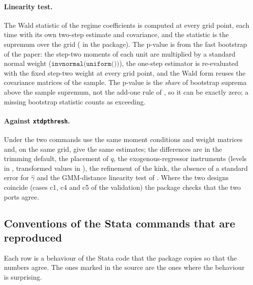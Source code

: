 \paragraph{Linearity test.} The Wald statistic of the regime coefficients is computed at every grid point, each time
with its own two-step estimate and covariance, and the statistic is the supremum over the grid
( in the package). The p-value is from the fast bootstrap of the paper: the step-two moments of each
unit are multiplied by a standard normal weight ($\texttt{invnormal(uniform())}$), the one-step estimator is
re-evaluated with the fixed step-two weight at every grid point, and the Wald form reuses the covariance matrices of the
sample. The p-value is the \emph{share} of bootstrap suprema above the sample supremum, not the add-one rule of
, so it can be exactly zero; a missing bootstrap statistic counts as exceeding.

\paragraph{Against \texttt{xtdpthresh}.} Under  the two commands use the same moment conditions and
weight matrices and, on the same grid, give the same estimates; the differences are in the trimming default, the
placement of $q$, the exogenous-regressor instruments (levels in , transformed values in
), the refinement of the kink, the absence of a standard error for $\hat\gamma$ and the GMM-distance
linearity test of . Where the two designs coincide (cases c1, c4 and c5 of the validation) the package
checks that the two ports agree.

\subsection{Conventions of the Stata commands that are reproduced}\label{note:quirks}

Each row is a behaviour of the Stata code that the package copies so that the numbers agree. The ones marked
 in the source are the ones where the behaviour is surprising.

